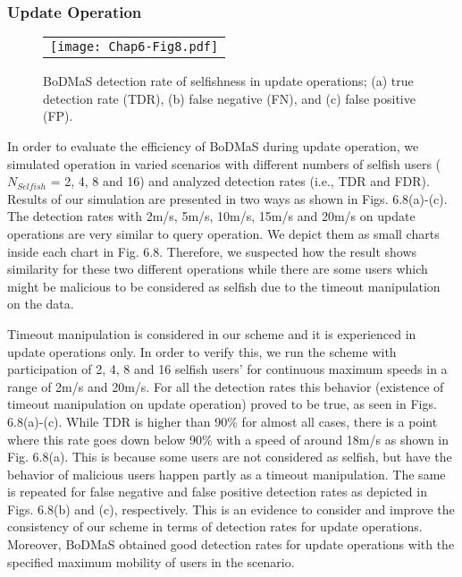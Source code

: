 \subsubsection{Update Operation}\label{Chap6_05_02_02}
\begin{figure}[t]
\begin{center}
  \begin{tabular}{c}
  \texttt{[image: Chap6-Fig8.pdf]}
  \end{tabular}
  \caption{BoDMaS detection rate of selfishness in update operations; (a) true detection rate (TDR), (b) false negative (FN), and (c) false positive (FP).}
\end{center}
\end{figure}
In order to evaluate the efficiency of BoDMaS during update operation, we simulated operation in varied scenarios with different numbers of selfish users ($N_{Selfish}$ = 2, 4, 8 and 16) and analyzed detection rates (i.e., TDR and FDR). Results of our simulation are presented in two ways as shown in Figs. 6.8(a)-(c).  The detection rates with 2m/s, 5m/s, 10m/s, 15m/s and 20m/s on update operations are very similar to query operation. We depict them as small charts inside each chart in Fig. 6.8.
Therefore, we suspected how the result shows similarity for these two different operations while there are some users which might be malicious to be considered as selfish due to the timeout manipulation on the data.

Timeout manipulation is considered in our scheme and it is experienced in update operations only. In order to verify this, we run the scheme with participation of 2, 4, 8 and 16 selfish users' for continuous maximum speeds in a range of 2m/s and 20m/s. For all the detection rates this behavior (existence of timeout manipulation on update operation) proved to be true, as seen in Figs. 6.8(a)-(c). While TDR is higher than 90\% for almost all cases, there is a point where this rate goes down below 90\% with a speed of around 18m/s as shown in Fig. 6.8(a). This is because some users are not considered as selfish, but have the behavior of malicious users happen partly as a timeout manipulation. The same is repeated for false negative and false positive detection rates as depicted in Figs. 6.8(b) and (c), respectively. This is an evidence to consider and improve the consistency of our scheme in terms of detection rates for update operations. Moreover, BoDMaS obtained good detection rates for update operations with the specified maximum mobility of users in the scenario.

